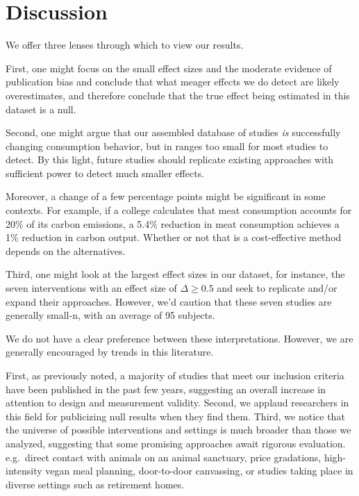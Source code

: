 \documentclass[sn-nature,pdflatex]{sn-jnl}
\begin{document}
\section{Discussion}\label{discussion}

We offer three lenses through which to view our results.

First, one might focus on the small effect sizes and the moderate
evidence of publication bias and conclude that what meager effects we do
detect are likely overestimates, and therefore conclude that the true
effect being estimated in this dataset is a null.

Second, one might argue that our assembled database of studies \emph{is}
successfully changing consumption behavior, but in ranges too small for
most studies to detect. By this light, future studies should replicate
existing approaches with sufficient power to detect much smaller
effects.

Moreover, a change of a few percentage points might be significant in
some contexts. For example, if a college calculates that meat
consumption accounts for 20\% of its carbon emissions, a 5.4\% reduction
in meat consumption \citep{jalil2023} achieves a 1\% reduction in carbon
output. Whether or not that is a cost-effective method depends on the
alternatives.

Third, one might look at the largest effect sizes in our dataset, for
instance, the seven interventions with an effect size of
\(\Delta \geq 0.5\)
\citep{bianchi2022, carfora2023, merrill2009, piester2020} and seek to
replicate and/or expand their approaches. However, we'd caution that
these seven studies are generally small-n, with an average of 95
subjects.

We do not have a clear preference between these interpretations.
However, we are generally encouraged by trends in this literature.

First, as previously noted, a majority of studies that meet our
inclusion criteria have been published in the past few years, suggesting
an overall increase in attention to design and measurement validity.
Second, we applaud researchers in this field for publicizing null
results when they find them. Third, we notice that the universe of
possible interventions and settings is much broader than those we
analyzed, suggesting that some promising approaches await rigorous
evaluation. e.g.~direct contact with animals on an animal sanctuary,
price gradations, high-intensity vegan meal planning, door-to-door
canvassing, or studies taking place in diverse settings such as
retirement homes.
\end{document}
